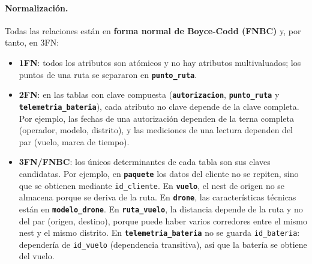\documentclass[11pt,a4paper]{article}
\newcommand{\tb}[1]{\textbf{\texttt{#1}}}
\newcommand{\at}[1]{\texttt{#1}}
\begin{document}
\paragraph{Normalización.} Todas las relaciones están en \textbf{forma normal de Boyce-Codd (FNBC)} y, por tanto, en 3FN:
\begin{itemize}
\item \textbf{1FN}: todos los atributos son atómicos y no hay atributos multivaluados; los puntos de una ruta se separaron en \tb{punto\_ruta}.
\item \textbf{2FN}: en las tablas con clave compuesta (\tb{autorizacion}, \tb{punto\_ruta} y \tb{telemetria\_bateria}), cada atributo no clave depende de la clave completa. Por ejemplo, las fechas de una autorización dependen de la terna completa (operador, modelo, distrito), y las mediciones de una lectura dependen del par (vuelo, marca de tiempo).
\item \textbf{3FN/FNBC}: los únicos determinantes de cada tabla son sus claves candidatas. Por ejemplo, en \tb{paquete} los datos del cliente no se repiten, sino que se obtienen mediante \at{id\_cliente}. En \tb{vuelo}, el nest de origen no se almacena porque se deriva de la ruta. En \tb{drone}, las características técnicas están en \tb{modelo\_drone}. En \tb{ruta\_vuelo}, la distancia depende de la ruta y no del par (origen, destino), porque puede haber varios corredores entre el mismo nest y el mismo distrito. En \tb{telemetria\_bateria} no se guarda \at{id\_bateria}: dependería de \at{id\_vuelo} (dependencia transitiva), así que la batería se obtiene del vuelo.
\end{itemize}
\end{document}
